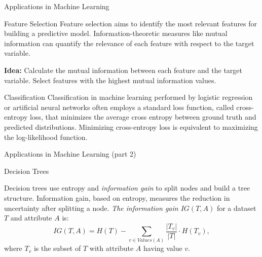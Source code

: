 \documentclass[
aspectratio=169]{beamer}
\begin{document}
\begin{frame}{Applications in Machine Learning}
    \begin{block}{Feature Selection}
        Feature selection aims to identify the most relevant features for building a predictive model. Information-theoretic measures like mutual information can quantify the relevance of each feature with respect to the target variable.

        \textbf{Idea:} Calculate the mutual information between each feature and the target variable. Select features with the highest mutual information values.
    \end{block}

    \begin{block}{Classification}
        Classification in machine learning performed by logistic regression or artificial neural networks often employs a standard loss function, called cross-entropy loss, that minimizes the average cross entropy between ground truth and predicted distributions.
        Minimizing cross-entropy loss is equivalent to maximizing the log-likelihood function.
    \end{block}
\end{frame}


\begin{frame}{Applications in Machine Learning (part 2)}
    \begin{block}{Decision Trees}

        Decision trees use entropy and \emph{information gain} to split nodes and build a tree structure. Information gain, based on entropy, measures the reduction in uncertainty after splitting a node.
        \emph{The information gain $IG(T,A)$} for a dataset $T$ and attribute $A$ is:
        \[
        IG(T,A) = H(T) - \sum_{v \in Values(A)} \frac{|T_v|}{|T|}\cdot H(T_v),
        \]
        where $T_v$ is the subset of $T$ with attribute $A$ having value $v$.
    \end{block}

\end{frame}
\end{document}
